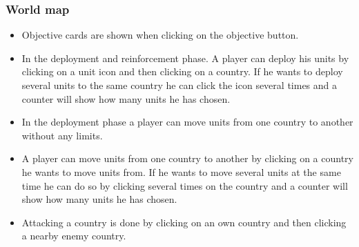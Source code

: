 \documentclass[12pt,a4paper]{article}
\begin{document}
\subsubsection{World map}

\begin{itemize}
\item Objective cards are shown when clicking on the objective button.
\item In the deployment and reinforcement phase. A player can deploy
  his units by clicking on a unit icon and then clicking on a
  country. If he wants to deploy several units to the same country he
  can click the icon several times and a counter will show how many
  units he has chosen.
\item In the deployment phase a player can move units from one country
  to another without any limits.
\item A player can move units from one country to another by clicking
  on a country he wants to move units from. If he wants to move
  several units at the same time he can do so by clicking several
  times on the country and a counter will show how many units he has
  chosen.
\item Attacking a country is done by clicking on an own country and
  then clicking a nearby enemy country.
\end{itemize}
\end{document}
